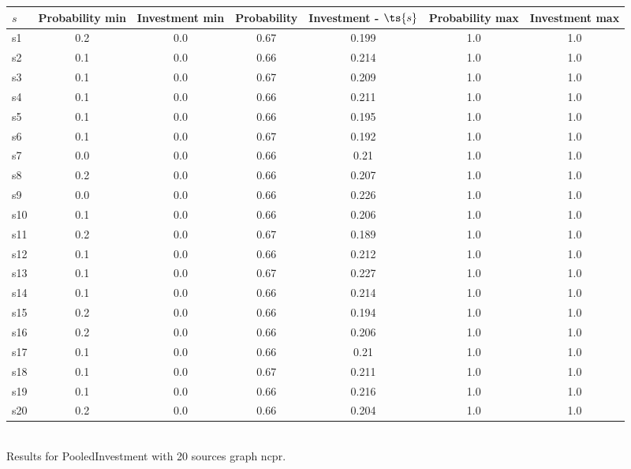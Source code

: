 \documentclass{article}
\begin{document}
\noindent\begin{tabular}{|l|c|c|c|c|c|c|}
\hline
$s$& Probability min & Investment min & Probability & Investment - $\ts{s}$ & Probability max & Investment max\\
\hline
s1 &0.2 & 0.0 & 0.67 & 0.199 & 1.0 & 1.0\\
\hline
s2 &0.1 & 0.0 & 0.66 & 0.214 & 1.0 & 1.0\\
\hline
s3 &0.1 & 0.0 & 0.67 & 0.209 & 1.0 & 1.0\\
\hline
s4 &0.1 & 0.0 & 0.66 & 0.211 & 1.0 & 1.0\\
\hline
s5 &0.1 & 0.0 & 0.66 & 0.195 & 1.0 & 1.0\\
\hline
s6 &0.1 & 0.0 & 0.67 & 0.192 & 1.0 & 1.0\\
\hline
s7 &0.0 & 0.0 & 0.66 & 0.21 & 1.0 & 1.0\\
\hline
s8 &0.2 & 0.0 & 0.66 & 0.207 & 1.0 & 1.0\\
\hline
s9 &0.0 & 0.0 & 0.66 & 0.226 & 1.0 & 1.0\\
\hline
s10 &0.1 & 0.0 & 0.66 & 0.206 & 1.0 & 1.0\\
\hline
s11 &0.2 & 0.0 & 0.67 & 0.189 & 1.0 & 1.0\\
\hline
s12 &0.1 & 0.0 & 0.66 & 0.212 & 1.0 & 1.0\\
\hline
s13 &0.1 & 0.0 & 0.67 & 0.227 & 1.0 & 1.0\\
\hline
s14 &0.1 & 0.0 & 0.66 & 0.214 & 1.0 & 1.0\\
\hline
s15 &0.2 & 0.0 & 0.66 & 0.194 & 1.0 & 1.0\\
\hline
s16 &0.2 & 0.0 & 0.66 & 0.206 & 1.0 & 1.0\\
\hline
s17 &0.1 & 0.0 & 0.66 & 0.21 & 1.0 & 1.0\\
\hline
s18 &0.1 & 0.0 & 0.67 & 0.211 & 1.0 & 1.0\\
\hline
s19 &0.1 & 0.0 & 0.66 & 0.216 & 1.0 & 1.0\\
\hline
s20 &0.2 & 0.0 & 0.66 & 0.204 & 1.0 & 1.0\\
\hline
\end{tabular}\\

\noindent Results for PooledInvestment with 20 sources graph ncpr.
\end{document}
